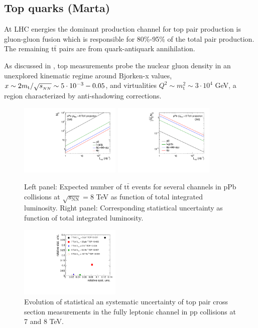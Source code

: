 \subsection{Top quarks (Marta)}
At LHC energies the dominant production channel for top pair production is gluon-gluon fusion which is responsible for 80\%-95\% of the total pair production. The remaining $\mathrm{t}\bar{\mathrm{t}}$ pairs are from quark-antiquark annihilation. 

As discussed in \cite{d'Enterria:2015jna}, top measurements probe the nuclear gluon density in an unexplored kinematic regime around Bjorken-x values, $x \sim 2m_{\mathrm{t}}/\sqrt{s_{_{NN}}} \sim 5 \cdot 10^{-3}-0.05$, and virtualities $Q^{2} \sim m_{\mathrm{t}}^{2} \sim 3 \cdot 10^{4}$ GeV, a region characterized by anti-shadowing corrections. 

\begin{figure}[h!]
\begin{center}
  \includegraphics[width= 0.43\textwidth]{figures/top/ProjectedTTbarYield.pdf}
  \includegraphics[width= 0.43\textwidth]{figures/top/ProjectedTTbarStatUnc.pdf}
  \caption{Left panel: Expected number of $\mathrm{t}\bar{\mathrm{t}}$ events for several channels in pPb collisions at $\sqrt{s_{\mathrm{NN}}}=8$ TeV as function of total integrated luminosity. Right panel: Corresponding statistical uncertainty as function of total integrated luminosity.
  }
\label{fig:ttPPbProjections}
\end{center}
\end{figure}

\begin{figure}[h!]
\begin{center}
  \includegraphics[width= 0.43\textwidth]{figures/top/topToLLXSecUncertaintiesPP.pdf}
  \caption{Evolution of statistical an systematic uncertainty of top pair cross section measurements in the fully leptonic channel in pp collisions at 7 and 8 TeV.
  }
\label{fig:ttStatSyst}
\end{center}
\end{figure}
